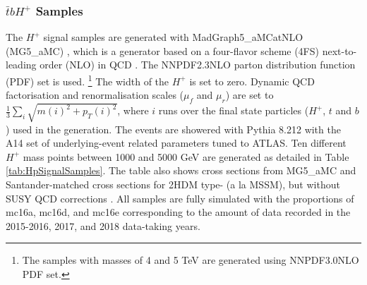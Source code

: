 \subsubsection{$\bar{t}bH^{+}$ Samples}
\label{subsec:HpSample}

\setcounter{Num}{2}

The $H^{+}$ signal samples are generated with MadGraph5\_aMCatNLO (MG5\_aMC) \cite{C.Degrande-2015}, which is a generator based on a four-flavor scheme (4FS) next-to-leading order (NLO) in QCD \cite{Alwall:2014hca}. The NNPDF2.3NLO \cite{Ball:2012cx} parton distribution function (PDF) set is used. \footnote{The samples with masses of 4 and 5 TeV are generated using NNPDF3.0NLO \cite{Ball:2014uwa} PDF set.} The width of the $H^{+}$ is set to zero. Dynamic QCD factorisation and renormalisation scales ($\mu_{f}$ and $\mu_{r}$) are set to $\frac{1}{3}\sum_{i}\sqrt{m(i)^{2}+p_{T}(i)^{2}}$, where $i$ runs over the final state particles ($H^{+}$, $t$ and $b$) used in the generation. The events are showered with Pythia 8.212 \cite{Sjostrand:2007gs} with the A14 \cite{ATL-PHYS-PUB-2014-021} set of underlying-event related parameters tuned to ATLAS. Ten different $H^{+}$ mass points between 1000 and 5000 GeV are generated as detailed in Table \ref{tab:HpSignalSamples}. The table also shows cross sections from MG5\_aMC and Santander-matched cross sections for 2HDM type- (a la MSSM), but without SUSY QCD corrections \cite{C.Degrande-2015, M.Flechl-2015, S.Dittmaier-2011, E.L.Berger-2005}. All samples are fully simulated with the proportions of mc16a, mc16d, and mc16e corresponding to the amount of data recorded in the 2015-2016, 2017, and 2018 data-taking years.


